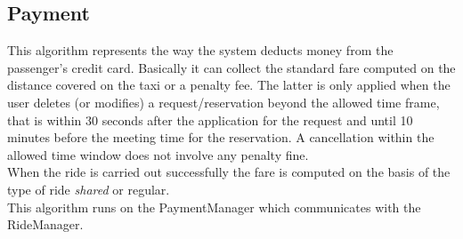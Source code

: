 \documentclass[a4paper,11pt]{report} %
\begin{document}
	\subsection{Payment}
	This algorithm represents the way the system deducts money from the passenger's credit card. Basically it can collect the standard fare computed on the distance covered on the taxi or a penalty fee. The latter is only applied when the user deletes (or modifies) a request/reservation beyond the allowed time frame, that is within 30 seconds after the application for the request and until 10 minutes before the meeting time for the reservation. A cancellation within the allowed time window does not involve any penalty fine.\\
	When the ride is carried out successfully the fare is computed on the basis of the type of ride \textit{shared} or regular.\\
	This algorithm runs on the PaymentManager which communicates with the RideManager.\\
	
\end{document}

